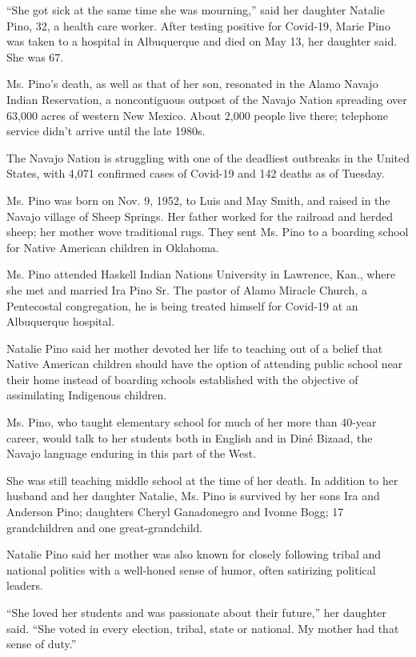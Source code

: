 ``She got sick at the same time she was mourning,'' said her daughter
Natalie Pino, 32, a health care worker. After testing positive for
Covid-19, Marie Pino was taken to a hospital in Albuquerque and died on
May 13, her daughter said. She was 67.

Ms. Pino's death, as well as that of her son, resonated in the Alamo
Navajo Indian Reservation, a noncontiguous outpost of the Navajo Nation
spreading over 63,000 acres of western New Mexico. About 2,000 people
live there; telephone service didn't arrive until the late 1980s.

The Navajo Nation is struggling with one of the deadliest outbreaks in
the United States, with 4,071 confirmed cases of Covid-19 and 142 deaths
as of Tuesday.

Ms. Pino was born on Nov. 9, 1952, to Luis and May Smith, and raised in
the Navajo village of Sheep Springs. Her father worked for the railroad
and herded sheep; her mother wove traditional rugs. They sent Ms. Pino
to a boarding school for Native American children in Oklahoma.

Ms. Pino attended Haskell Indian Nations University in Lawrence, Kan.,
where she met and married Ira Pino Sr. The pastor of Alamo Miracle
Church, a Pentecostal congregation, he is being treated himself for
Covid-19 at an Albuquerque hospital.

Natalie Pino said her mother devoted her life to teaching out of a
belief that Native American children should have the option of attending
public school near their home instead of boarding schools established
with the objective of assimilating Indigenous children.

Ms. Pino, who taught elementary school for much of her more than 40-year
career, would talk to her students both in English and in Diné Bizaad,
the Navajo language enduring in this part of the West.

She was still teaching middle school at the time of her death. In
addition to her husband and her daughter Natalie, Ms. Pino is survived
by her sons Ira and Anderson Pino; daughters Cheryl Ganadonegro and
Ivonne Bogg; 17 grandchildren and one great-grandchild.

Natalie Pino said her mother was also known for closely following tribal
and national politics with a well-honed sense of humor, often satirizing
political leaders.

``She loved her students and was passionate about their future,'' her
daughter said. ``She voted in every election, tribal, state or national.
My mother had that sense of duty.''

